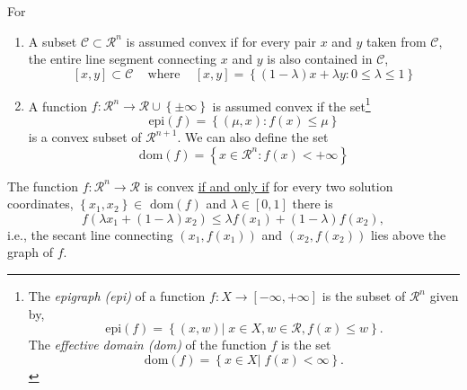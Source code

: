 \begin{itemize}
\begin{defn} For
   \begin{enumerate}
       \item A subset $\mathcal{C}\subset\mathcal{R}^{n}$ is assumed convex if for every pair $x$ and $y$ taken from $\mathcal{C}$, the entire line segment connecting $x$ and $y$ is also contained in $\mathcal{C}$,
           \begin{displaymath}
              \left[x,y\right]\subset\mathcal{C}\;\;\;\text{ where }\;\;\; \left[x,y\right]=\left\{\left(1-\lambda\right)x +\lambda y : 0\le\lambda\le 1\right\}
           \end{displaymath}
       \item A function $f:\mathcal{R}^{n}\rightarrow \mathcal{R}\cup\left\{\pm\infty\right\}$ is assumed convex if the set\footnote{The {\it epigraph (epi)} of a function $f:X\rightarrow\left[-\infty,+\infty\right]$ is the subset of $\mathcal{R}^{n}$ given by,
            \begin{displaymath}
                \text{epi}(f) = \left\{\left(x,w\right)\left|\; x\in X,w\in\mathcal{R}, f(x) \le w\right.\right\}.
            \end{displaymath}
          The {\it effective domain (dom)} of the function $f$ is the set
            \begin{displaymath}
                \text{dom}(f) = \left\{x\in X \left|\; f(x) < \infty\right.\right\}.
            \end{displaymath}
           } 
           \begin{displaymath}
              \text{epi}(f) = \left\{\left(\mu,x\right): f(x)\le \mu\right\}
           \end{displaymath}
           is a convex subset of $\mathcal{R}^{n+1}$. We can also define the set 
           \begin{displaymath}
              \text{dom}(f) = \left\{x\in\mathcal{R}^{n} : f(x) < +\infty\right\}
           \end{displaymath}
   \end{enumerate}
\end{defn}

\begin{lem}
    The function $f : \mathcal{R}^{n}\rightarrow\mathcal{R}$ is convex \underline{if and only if} for every two solution coordinates, $\left\{x_{1},x_{2}\right\}\in\text{ dom}(f)$ and $\lambda\in\left[0,1\right]$ there is
       \begin{displaymath}
          f\left(\lambda x_{1} +\left(1-\lambda\right)x_{2}\right) \le \lambda f\left(x_{1}\right) + \left(1 - \lambda\right)f\left(x_{2}\right),
       \end{displaymath}
i.e., the secant line connecting $\left(x_{1},f\left(x_{1}\right)\right)$ and $\left(x_{2},f\left(x_{2}\right)\right)$ lies above the graph of $f$.
\end{lem}



\end{itemize}
